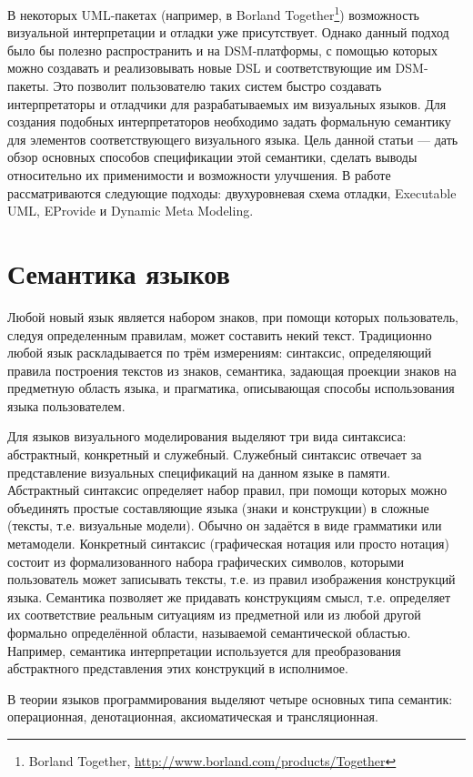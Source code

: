 \documentclass[a5paper]{article}
\begin{document}
В некоторых UML-пакетах (например, в Borland Together\footnote{Borland Together, \url{http://www.borland.com/products/Together}}) возможность визуальной интерпретации и отладки уже присутствует. Однако данный подход было бы полезно распространить и на DSM-платформы, с помощью которых можно создавать и реализовывать новые DSL и соответствующие им DSM-пакеты. Это позволит пользователю таких систем быстро создавать интерпретаторы и отладчики для разрабатываемых им визуальных языков. Для создания подобных интерпретаторов необходимо задать формальную семантику для элементов соответствующего визуального языка. Цель данной статьи --- дать обзор основных способов спецификации этой семантики, сделать выводы относительно их применимости и возможности улучшения. В работе рассматриваются следующие подходы: двухуровневая схема отладки, Executable UML, EProvide и Dynamic Meta Modeling. 

\section{Семантика языков}

Любой новый язык является набором знаков, при помощи которых пользователь, следуя определенным правилам, может составить некий текст. Традиционно любой язык раскладывается по трём измерениям: синтаксис, определяющий правила построения текстов из знаков, семантика, задающая проекции знаков на предметную область языка, и прагматика, описывающая способы использования языка пользователем.

Для языков визуального моделирования выделяют три вида синтаксиса: абстрактный, конкретный и служебный. Служебный синтаксис отвечает за представление визуальных спецификаций на данном языке в памяти. Абстрактный синтаксис определяет набор правил, при помощи которых можно объединять простые составляющие языка (знаки и конструкции) в сложные (тексты, т.е. визуальные модели). Обычно он задаётся в виде грамматики или метамодели. Конкретный синтаксис (графическая нотация или просто нотация) состоит из формализованного набора графических символов, которыми пользователь может записывать тексты, т.е. из правил изображения конструкций языка. Семантика позволяет же придавать конструкциям смысл, т.е. определяет их соответствие реальным ситуациям из предметной или из любой другой формально определённой области, называемой семантической областью. Например, семантика интерпретации используется для преобразования абстрактного представления этих конструкций в исполнимое.

В теории языков программирования выделяют четыре основных типа семантик: операционная, денотационная, аксиоматическая и трансляционная.
\end{document}

